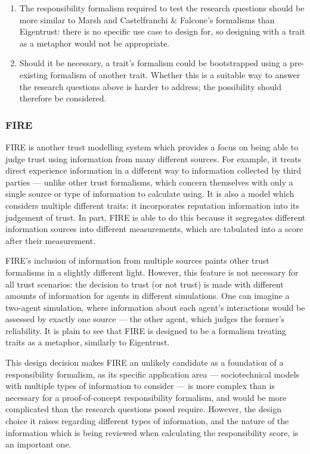 \begin{enumerate}
    \item The responsibility formalism required to test the research questions should be more similar to Marsh and Castelfranchi \& Falcone's formalisms than Eigentrust: there is no specific use case to design for, so designing with a trait as a metaphor would not be appropriate.
    \item Should it be necessary, a trait's formalism could be bootstrapped using a pre-existing formalism of another trait. Whether this is a suitable way to answer the research questions above is harder to address; the possibility should therefore be considered.
\end{enumerate}

\subsubsection{FIRE~\cite{huynh2004fire}}
FIRE\cite{huynh2004fire} is another trust modelling system which provides a focus on being able to judge trust using information from many different sources. For example, it treats direct experience  information in a different way to information collected by third parties --- unlike other trust formalisms, which concern themselves with only a single source or type of information to calculate using. It is also a model which considers multiple different traits: it incorporates reputation information into its judgement of trust. In part, FIRE is able to do this because it segregates different information sources into different measurements, which are tabulated into a score after their measurement.\par

FIRE's inclusion of information from multiple sources paints other trust formalisms in a slightly different light. However, this feature is not necessary for all trust scenarios: the decision to trust (or not trust) is made with different amounts of information for agents in different simulations. One can imagine a two-agent simulation, where information about each agent's interactions would be assessed by exactly one source --- the other agent, which judges the former's reliability. It is plain to see that FIRE is designed to be a formalism treating traits as a metaphor, similarly to Eigentrust.\par

This design decision makes FIRE an unlikely candidate as a foundation of a responsibility formalism, as its specific application area --- sociotechnical models with multiple types of information to consider --- is more complex than is necessary for a proof-of-concept responsibility formalism, and would be more complicated than the research questions posed require. However, the design choice it raises regarding different types of information, and the nature of the information which is being reviewed when calculating the responsibility score, is an important one.\par

